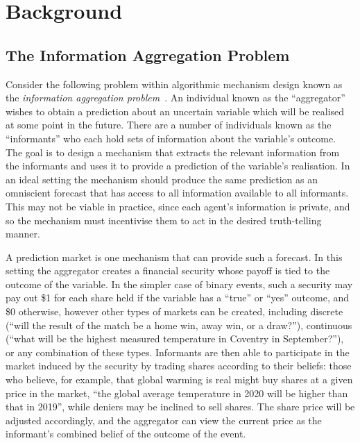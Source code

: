 \section{Background}

\label{sec:background}

\subsection{The Information Aggregation Problem}

Consider the following problem within algorithmic mechanism design known as the
\emph{information aggregation problem}~\cite[Ch.~26]{AGTBook}. An individual
known as the ``aggregator'' wishes to obtain a prediction about an uncertain
variable which will be realised at some point in the future. There are a number
of individuals known as the ``informants'' who each hold sets of information
about the variable's outcome. The goal is to design a mechanism that extracts
the relevant information from the informants and uses it to provide a
prediction of the variable's realisation. In an ideal setting the mechanism
should produce the same prediction as an omniscient forecast that has access to
all information available to all informants. This may not be viable in
practice, since each agent's information is private, and so the mechanism must
incentivise them to act in the desired truth-telling manner.

A prediction market is one mechanism that can provide such a forecast. In this
setting the aggregator creates a financial security whose payoff is tied to the
outcome of the variable. In the simpler case of binary events, such a security
may pay out \$1 for each share held if the variable has a ``true'' or ``yes''
outcome, and \$0 otherwise, however other types of markets can be created,
including discrete (``will the result of the match be a home win, away win, or
a draw?''), continuous (``what will be the highest measured temperature in
Coventry in September?''), or any combination of these types. Informants are
then able to participate in the market induced by the security by trading
shares according to their beliefs: those who believe, for example, that global
warming is real might buy shares at a given price in the market, ``the global
average temperature in 2020 will be higher than that in 2019'', while deniers
may be inclined to sell shares. The share price will be adjusted accordingly,
and the aggregator can view the current price as the informant's combined
belief of the outcome of the event.

